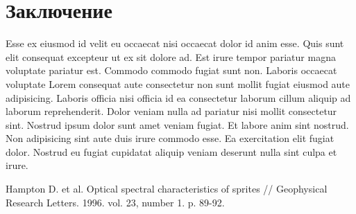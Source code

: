 \documentclass[12pt,a4paper]{report}
\begin{document}
\chapter*{Заключение}

Esse ex eiusmod id velit eu occaecat nisi occaecat dolor id anim esse. Quis sunt elit consequat excepteur ut ex sit dolore ad. Est irure tempor pariatur magna voluptate pariatur est. Commodo commodo fugiat sunt non. Laboris occaecat voluptate Lorem consequat aute consectetur non sunt mollit fugiat eiusmod aute adipisicing. Laboris officia nisi officia id ea consectetur laborum cillum aliquip ad laborum reprehenderit. Dolor veniam nulla ad pariatur nisi mollit consectetur sint. Nostrud ipsum dolor sunt amet veniam fugiat. Et labore anim sint nostrud. Non adipisicing sint aute duis irure commodo esse. Ea exercitation elit fugiat dolor. Nostrud eu fugiat cupidatat aliquip veniam deserunt nulla sint culpa et irure.

\renewcommand\bibname{Cписок литературы}

\begin{thebibliography}{3}
     Hampton D. et al. Optical spectral characteristics of sprites // Geophysical Research Letters. 1996. vol. 23, number 1. p. 89-92.
\end{thebibliography}
\end{document}
